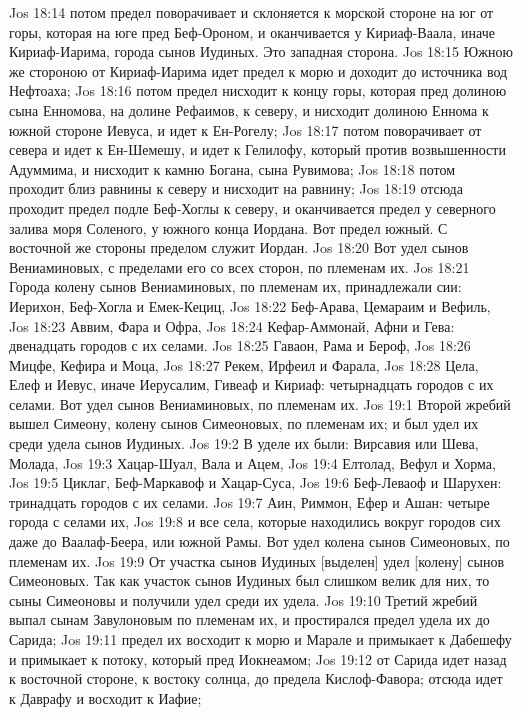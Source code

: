 Jos 18:14  потом предел поворачивает и склоняется к морской стороне на юг от горы, которая на юге пред Беф-Ороном, и оканчивается у Кириаф-Ваала, иначе Кириаф-Иарима, города сынов Иудиных. Это западная сторона.
Jos 18:15  Южною же стороною от Кириаф-Иарима идет предел к морю и доходит до источника вод Нефтоаха;
Jos 18:16  потом предел нисходит к концу горы, которая пред долиною сына Енномова, на долине Рефаимов, к северу, и нисходит долиною Еннома к южной стороне Иевуса, и идет к Ен-Рогелу;
Jos 18:17  потом поворачивает от севера и идет к Ен-Шемешу, и идет к Гелилофу, который против возвышенности Адуммима, и нисходит к камню Богана, сына Рувимова;
Jos 18:18  потом проходит близ равнины к северу и нисходит на равнину;
Jos 18:19  отсюда проходит предел подле Беф-Хоглы к северу, и оканчивается предел у северного залива моря Соленого, у южного конца Иордана. Вот предел южный. С восточной же стороны пределом служит Иордан.
Jos 18:20  Вот удел сынов Вениаминовых, с пределами его со всех сторон, по племенам их.
Jos 18:21  Города колену сынов Вениаминовых, по племенам их, принадлежали сии: Иерихон, Беф-Хогла и Емек-Кециц,
Jos 18:22  Беф-Арава, Цемараим и Вефиль,
Jos 18:23  Аввим, Фара и Офра,
Jos 18:24  Кефар-Аммонай, Афни и Гева: двенадцать городов с их селами.
Jos 18:25  Гаваон, Рама и Бероф,
Jos 18:26  Мицфе, Кефира и Моца,
Jos 18:27  Рекем, Ирфеил и Фарала,
Jos 18:28  Цела, Елеф и Иевус, иначе Иерусалим, Гивеаф и Кириаф: четырнадцать городов с их селами. Вот удел сынов Вениаминовых, по племенам их.
Jos 19:1  Второй жребий вышел Симеону, колену сынов Симеоновых, по племенам их; и был удел их среди удела сынов Иудиных.
Jos 19:2  В уделе их были: Вирсавия или Шева, Молада,
Jos 19:3  Хацар-Шуал, Вала и Ацем,
Jos 19:4  Елтолад, Вефул и Хорма,
Jos 19:5  Циклаг, Беф-Маркавоф и Хацар-Суса,
Jos 19:6  Беф-Леваоф и Шарухен: тринадцать городов с их селами.
Jos 19:7  Аин, Риммон, Ефер и Ашан: четыре города с селами их,
Jos 19:8  и все села, которые находились вокруг городов сих даже до Ваалаф-Беера, или южной Рамы. Вот удел колена сынов Симеоновых, по племенам их.
Jos 19:9  От участка сынов Иудиных [выделен] удел [колену] сынов Симеоновых. Так как участок сынов Иудиных был слишком велик для них, то сыны Симеоновы и получили удел среди их удела.
Jos 19:10  Третий жребий выпал сынам Завулоновым по племенам их, и простирался предел удела их до Сарида;
Jos 19:11  предел их восходит к морю и Марале и примыкает к Дабешефу и примыкает к потоку, который пред Иокнеамом;
Jos 19:12  от Сарида идет назад к восточной стороне, к востоку солнца, до предела Кислоф-Фавора; отсюда идет к Даврафу и восходит к Иафие;
